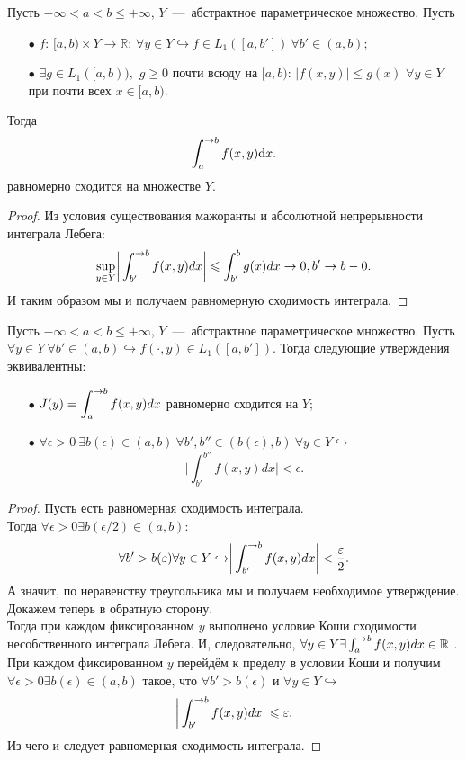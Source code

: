 \begin{theorem}
    Пусть $-\infty < a < b \leq +\infty$, $Y$~---~абстрактное параметрическое множество. Пусть
    \begin{enumerate}
        \item[$\bullet$] $f$: $[a, b) \times Y \to \mathbb{R}$: $\forall y \in Y \hookrightarrow f \in L_1 ([a, b']) \ \forall b' \in (a, b)$;
        \item[$\bullet$] $\exists g \in L_1 ([a, b)),$ $g \geq 0$ почти всюду на $[a, b)$: $|f(x, y)| \leq g(x)$ $\forall y \in Y$ при почти всех $x \in [a, b)$.
    \end{enumerate}
    Тогда \[
              \int_a^{\rightarrow b} f(x, y) \text{d}x.
    \]
    равномерно сходится на множестве $Y$.
\end{theorem}
\begin{proof}
    Из условия существования мажоранты и абсолютной непрерывности интеграла Лебега:
    \[
        \sup\limits_{y \in Y} \biggr| \int_{b'}^{\rightarrow b} f(x, y)dx \biggr| \leqslant \int_{b'}^{b} g(x)dx \rightarrow 0, b' \rightarrow b - 0.
    \]
    И таким образом мы и получаем равномерную сходимость интеграла.
\end{proof}
\begin{theorem}
    Пусть $-\infty < a < b \leq +\infty$, $Y$~---~абстрактное параметрическое множество. Пусть $\forall y \in Y \ \forall b' \in (a, b) \hookrightarrow f(\cdot, y) \in L_1([a, b'])$.
    Тогда следующие утверждения эквивалентны:
    \begin{enumerate}
        \item[$\bullet$] $\displaystyle J(y) = \int_a^{\rightarrow b} f(x, y)dx$ равномерно сходится на $Y$;
        \item[$\bullet$] $\forall \epsilon > 0 \ \exists b(\epsilon) \in (a, b) \ \forall b', b'' \in (b(\epsilon), b) \ \forall y \in Y \hookrightarrow$
        \[
            \biggr|\int_{b'}^{b''} f(x, y)dx \biggr| < \epsilon.
        \]
    \end{enumerate}
\end{theorem}
\begin{proof}
    Пусть есть равномерная сходимость интеграла. \\
    Тогда $\forall \epsilon > 0 \exists b(\epsilon/2) \in (a, b)$:
    \[
        \forall b' > b(\varepsilon) \forall y \in Y \hookrightarrow \biggr|\int_{b'}^{\rightarrow b}f(x, y)dx \biggr| < \dfrac{\varepsilon}{2}.
    \]
    А значит, по неравенству треугольника мы и получаем необходимое утверждение. \\
    Докажем теперь в обратную сторону. \\
    Тогда при каждом фиксированном $y$ выполнено условие Коши сходимости несобственного интеграла Лебега.
    И, следовательно, $\forall y \in Y \exists \int_{a}^{\rightarrow b} f(x, y)dx \in \mathbb{R}$ .
    При каждом фиксированном $y$ перейдём к пределу в условии Коши и получим $\forall \epsilon > 0 \exists b(\epsilon) \in (a, b)$ такое, что $\forall b' > b(\epsilon)$ и $\forall y \in Y \hookrightarrow$
    \[
        \biggr| \int_{b'}^{\rightarrow b}f(x, y)dx \biggr| \leqslant \varepsilon.
    \]
    Из чего и следует равномерная сходимость интеграла.
\end{proof}


